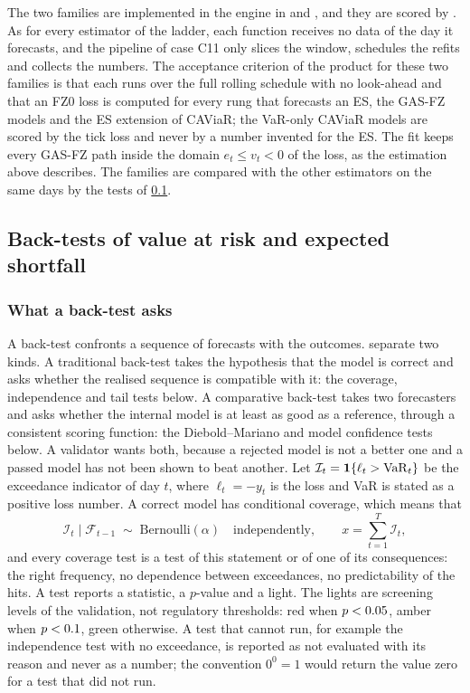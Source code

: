 The two families are implemented in the engine in  and , and they are scored by
. As for every estimator of the ladder, each function receives no data of the day it forecasts, and the pipeline of
case C11 only slices the window, schedules the refits and collects the numbers. The acceptance criterion of the product for these two families is
that each runs over the full rolling schedule with no look-ahead and that an FZ0 loss is computed for every rung that forecasts an ES, the GAS-FZ models and the ES extension of CAViaR; the VaR-only CAViaR
models are scored by the tick loss and never by a number invented for the ES. The fit keeps every GAS-FZ path inside the domain $e_t\le v_t<0$ of the loss, as the estimation above describes. The families are compared with the other estimators on the same days by the tests of
\cref{sec:m19}.

\subsection{Back-tests of value at risk and expected shortfall}
\label{sec:m19}

\subsubsection{What a back-test asks}
A back-test confronts a sequence of forecasts with the outcomes. \citet{market:noldeziegel2017} separate two kinds. A traditional
back-test takes the hypothesis that the model is correct and asks whether the realised sequence is compatible with it: the coverage,
independence and tail tests below. A comparative back-test takes two forecasters and asks whether the internal model is at least as good as
a reference, through a consistent scoring function: the Diebold--Mariano and model confidence tests below. A validator wants both, because
a rejected model is not a better one and a passed model has not been shown to beat another. Let $\mathcal I_t=\mathbf{1}\{\ell_t>\mathrm{VaR}_t\}$ be the
exceedance indicator of day $t$, where $\ell_t=-y_t$ is the loss and VaR is stated as a positive loss number. A correct model has
conditional coverage, which means that
\begin{equation}
\mathcal I_t\mid\mathcal F_{t-1}\;\sim\;\mathrm{Bernoulli}(\alpha)\quad\text{independently},\qquad x=\sum_{t=1}^T\mathcal I_t,
\label{eq:mk-exceed}
\end{equation}
and every coverage test is a test of this statement or of one of its consequences: the right frequency, no dependence between
exceedances, no predictability of the hits. A test reports a statistic, a $p$-value and a light. The lights are screening levels of the
validation, not regulatory thresholds: red when $p<0.05{}$, amber when $p<0.1{}$, green otherwise. A test that cannot run, for
example the independence test with no exceedance, is reported as not evaluated with its reason and never as a number; the convention
$0^0=1$ would return the value zero for a test that did not run.

